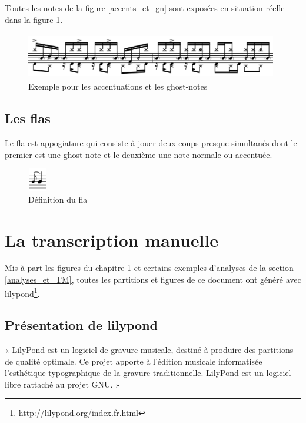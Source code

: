 Toutes les notes de la figure \ref{accents_et_gn} sont exposées en situation
réelle dans la figure \ref{exemple_acc_et_gn}. 
\begin{figure}[h]
\centering
\includegraphics[height=20mm, width=110mm]{
z_images/3_methodes/0_notation_de_la_batterie/8_accents_et_ghost-notes_1.png}
\caption{Exemple pour les accentuations et les ghost-notes}
\label{exemple_acc_et_gn}
\end{figure}

\subsection*{Les flas}
Le fla est appogiature qui consiste à jouer deux coups presque simultanés dont
le premier est une ghost note et le deuxième une note normale ou accentuée.
\begin{figure}[h]
    \centering
    \includegraphics[height=10mm, width=8mm]{
    z_images/3_methodes/0_notation_de_la_batterie/fla_def.png}
    \caption{Définition du fla}
\end{figure}

\section{La transcription manuelle}
Mis à part les figures du chapitre 1 et certains exemples d’analyses de la
section \ref{analyses_et_TM}, toutes les partitions et figures de ce document
ont généré avec lilypond\footnote{\url{http://lilypond.org/index.fr.html}}.\\

\subsection*{Présentation de lilypond}
« LilyPond est un logiciel de gravure musicale, destiné à produire des
partitions de qualité optimale. Ce projet apporte à l’édition musicale
informatisée l’esthétique typographique de la gravure traditionnelle. LilyPond
est un logiciel libre rattaché au projet GNU. »\\

